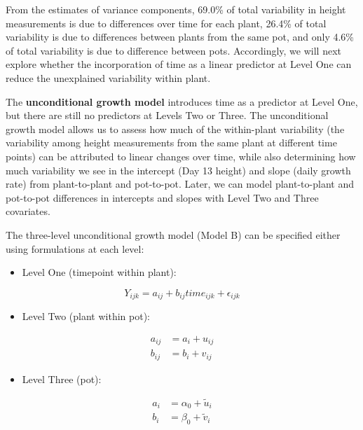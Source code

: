 \documentclass[
]{krantz}
\providecommand{\tightlist}{%
  \setlength{\itemsep}{0pt}\setlength{\parskip}{0pt}}
\begin{document}
From the estimates of variance components, 69.0\% of total variability in height measurements is due to differences over time for each plant, 26.4\% of total variability is due to differences between plants from the same pot, and only 4.6\% of total variability is due to difference between pots. Accordingly, we will next explore whether the incorporation of time as a linear predictor at Level One can reduce the unexplained variability within plant.

The \textbf{unconditional growth model} introduces time as a predictor at Level One, but there are still no predictors at Levels Two or Three. The unconditional growth model allows us to assess how much of the within-plant variability (the variability among height measurements from the same plant at different time points) can be attributed to linear changes over time, while also determining how much variability we see in the intercept (Day 13 height) and slope (daily growth rate) from plant-to-plant and pot-to-pot. Later, we can model plant-to-plant and pot-to-pot differences in intercepts and slopes with Level Two and Three covariates.

The three-level unconditional growth model (Model B) can be specified either using formulations at each level:

\begin{itemize}
\tightlist
\item
  Level One (timepoint within plant):
\end{itemize}

\begin{equation}
Y_{ijk} = a_{ij}+b_{ij}\textstyle{time}_{ijk}+\epsilon_{ijk}
\label{eq:timewithplnt}
\end{equation}

\begin{itemize}
\tightlist
\item
  Level Two (plant within pot):
\end{itemize}

\begin{align*}
a_{ij} & = a_{i}+u_{ij} \\
b_{ij} & = b_{i}+v_{ij}
\end{align*}

\begin{itemize}
\tightlist
\item
  Level Three (pot):
\end{itemize}

\begin{align*}
a_{i} & = \alpha_{0}+\tilde{u}_{i} \\
b_{i} & = \beta_{0}+\tilde{v}_{i}
\end{align*}
\end{document}
